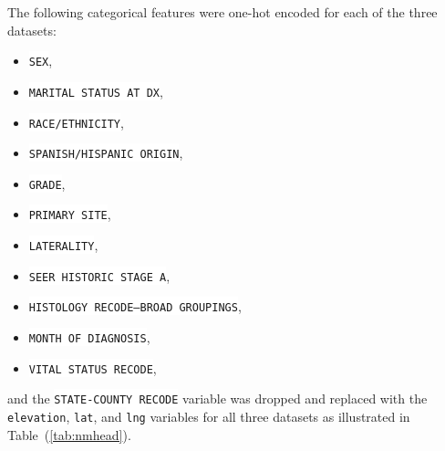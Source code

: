 \documentclass[10pt,letterpaper]{article}
\newcommand{\codewhite}[1]{\colorbox{white}{\texttt{#1}}}
\begin{document}



The following categorical features were one-hot encoded for each of the three datasets:

\begin{itemize}[noitemsep]
\item \codewhite{SEX},
\item  \codewhite{MARITAL STATUS AT DX},
\item \codewhite{RACE/ETHNICITY},
\item \codewhite{SPANISH/HISPANIC ORIGIN},
\item \codewhite{GRADE},
\item \codewhite{PRIMARY SITE},
\item \codewhite{LATERALITY},
\item \codewhite{SEER HISTORIC STAGE A},
\item \codewhite{HISTOLOGY RECODE--BROAD GROUPINGS},
\item \codewhite{MONTH OF DIAGNOSIS},
\item  \codewhite{VITAL STATUS RECODE},
\end{itemize}
and the \codewhite{STATE-COUNTY RECODE} variable was dropped and replaced with the \codewhite{elevation}, \codewhite{lat}, and \codewhite{lng} variables for all three datasets as illustrated in Table~(\ref{tab:nmhead}).
\end{document}
